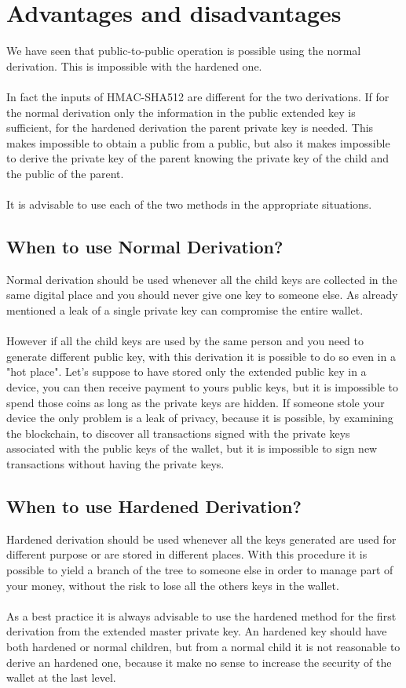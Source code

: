 \section{Advantages and disadvantages}
We have seen that public-to-public operation is possible using the normal derivation. This is impossible with the hardened one.
\\ \\
In fact the inputs of HMAC-SHA512 are different for the two derivations. If for the normal derivation only the information in the public extended key is sufficient, for the hardened derivation the parent private key is needed. This makes impossible to obtain a public from a public, but also it makes impossible to derive the private key of the parent knowing the private key of the child and the public of the parent.
\\ \\
It is advisable to use each of the two methods in the appropriate situations.

\subsection{When to use Normal Derivation?}
Normal derivation should be used whenever all the child keys are collected in the same digital place and you should never give one key to someone else. As already mentioned a leak of a single private key can compromise the entire wallet.
\\ \\
However if all the child keys are used by the same person and you need to generate different public key, with this derivation it is possible to do so even in a "hot place". Let's suppose to have stored only the extended public key in a device, you can then receive payment to yours public keys, but it is impossible to spend those coins as long as the private keys are hidden. If someone stole your device the only problem is a leak of privacy, because it is possible, by examining the blockchain, to discover all transactions signed with the private keys associated with the public keys of the wallet, but it is impossible to sign new transactions without having the private keys.


\subsection{When to use Hardened Derivation?}
Hardened derivation should be used whenever all the keys generated are used for different purpose or are stored in different places. With this procedure it is possible to yield a branch of the tree to someone else in order to manage part of your money, without the risk to lose all the others keys in the wallet.
\\ \\
As a best practice it is always advisable to use the hardened method for the first derivation from the extended master private key. An hardened key should have both hardened or normal children, but from a normal child it is not reasonable to derive an hardened one, because it make no sense to increase the security of the wallet at the last level.


